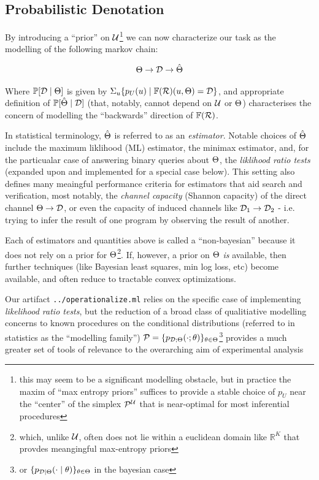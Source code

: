 \documentclass{article}
\begin{document}
\subsection{Probabilistic Denotation}

By introducing a ``prior'' on $\mathcal{U}$\footnote{this may seem to be a significant modelling obstacle, but in practice the maxim of ``max entropy priors'' suffices to provide a stable choice of $p_U$ near the ``center'' of the simplex $\mathcal{P}^{\mathcal{U}}$ that is near-optimal for most inferential procedures} we can now characterize our task as the modelling of the following markov chain:

\begin{equation*}
  \Theta \to \mathcal{D} \to \hat{\Theta}
\end{equation*}

Where $\mathbb{P}[\mathcal{D} \mid \Theta]$ is given by $\Sigma_u \{p_U(u) \mid \mathbb{F}(\mathcal{R})(u, \Theta) = \mathcal{D}\}$, and appropriate definition of $\mathbb{P}[\hat{\Theta} \mid \mathcal{D}]$ (that, notably, cannot depend on $\mathcal{U}$ or $\Theta$) characterises the concern of modelling the ``backwards'' direction of $\mathbb{F}(\mathcal{R})$.

In statistical terminology, $\hat{\Theta}$ is referred to as an \textit{estimator}. Notable choices of $\hat{\Theta}$ include the maximum liklihood (ML) estimator, the minimax estimator, and, for the particualar case of answering binary queries about $\Theta$, the \textit{liklihood ratio tests} (expanded upon and implemented for a special case below). This setting also defines many meaingful performance criteria for estimators that aid search and verification, most notably, the \textit{channel capacity} (Shannon capacity) of the direct channel $\Theta \to \mathcal{D}$, or even the capacity of induced channels like $\mathcal{D}_1 \to \mathcal{D}_2$ - i.e. trying to infer the result of one program by observing the result of another.


Each of estimators and quantities above is called a ``non-bayesian'' because it does not rely on a prior for $\Theta$\footnote{which, unlike $\mathcal{U}$, often does not lie within a euclidean domain like $\mathbb{R}^K$ that provdes meangingful max-entropy priors}. If, however, a prior on $\Theta$ \textit{is} available, then further techniques (like Bayesian least squares, min log loss, etc) become available, and often reduce to tractable convex optimizations.

\renewcommand{\P}{\mathcal{P}}

Our artifact \texttt{../operationalize.ml} relies on the specific case of implementing \textit{likelihood ratio tests}, but the reduction of a broad class of qualitiative modelling concerns to known procedures on the conditional distributions (referred to in statistics as the ``modelling family'') $\P = \{p_{\D ; \MU}(\cdot ; \theta)\}_{\theta \in \MU}$\footnote{or $\{p_{\mathcal{D} \mid \Theta}(\cdot \mid \theta)\}_{\theta \in \Theta}$ in the bayesian case} provides a much greater set of tools of relevance to the overarching aim of experimental analysis
\end{document}
